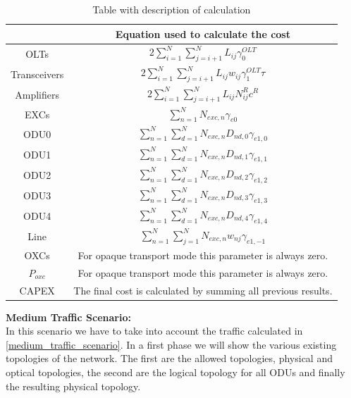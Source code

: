 \begin{table}[H]
\centering
\begin{tabular}{|| c | c ||}
 \hline
  & Equation used to calculate the cost \\ \hline
 OLTs & \(\displaystyle 2 \sum_{i=1}^{N}\sum_{j=i+1}^{N} L_{ij} \gamma_0^{OLT} \) \\ \hline
 Transceivers & \(\displaystyle 2 \sum_{i=1}^{N}\sum_{j=i+1}^{N} L_{ij} w_{ij} \gamma_1^{OLT} \tau \) \\ \hline
 Amplifiers & \(\displaystyle 2 \sum_{i=1}^{N}\sum_{j=i+1}^{N} L_{ij} N^R_{ij} c^R \) \\ \hline
 EXCs & \(\displaystyle \sum_{n=1}^N N_{exc,n} \gamma_{e0} \) \\ \hline
 ODU0 & \(\displaystyle \sum_{n=1}^{N} \sum_{d=1}^{N} N_{exc,n} D_{nd,0} \gamma_{e1,0} \) \\ \hline
 ODU1 & \(\displaystyle \sum_{n=1}^{N} \sum_{d=1}^{N} N_{exc,n} D_{nd,1} \gamma_{e1,1} \) \\ \hline
 ODU2 & \(\displaystyle \sum_{n=1}^{N} \sum_{d=1}^{N} N_{exc,n} D_{nd,2} \gamma_{e1,2} \)\\ \hline
 ODU3 & \(\displaystyle \sum_{n=1}^{N} \sum_{d=1}^{N} N_{exc,n} D_{nd,3} \gamma_{e1,3} \) \\ \hline
 ODU4 & \(\displaystyle \sum_{n=1}^{N} \sum_{d=1}^{N} N_{exc,n} D_{nd,4} \gamma_{e1,4} \) \\ \hline
 Line & \(\displaystyle \sum_{n=1}^{N} \sum_{j=1}^{N} N_{exc,n} w_{nj} \gamma_{e1,-1} \) \\ \hline
 OXCs & For opaque transport mode this parameter is always zero. \\ \hline
 $P_{oxc}$ & For opaque transport mode this parameter is always zero. \\ \hline
 CAPEX & The final cost is calculated by summing all previous results. \\
 \hline
 \end{tabular}
\caption{Table with description of calculation}
\label{formulas_opaque_heuristic}
\end{table}

\newpage
\noindent
\textbf{Medium Traffic Scenario:}\\

In this scenario we have to take into account the traffic calculated in \ref{medium_traffic_scenario}. In a first phase we will show the various existing topologies of the network. The first are the allowed topologies, physical and optical topologies, the second are the logical topology for all ODUs and finally the resulting physical topology.\\


